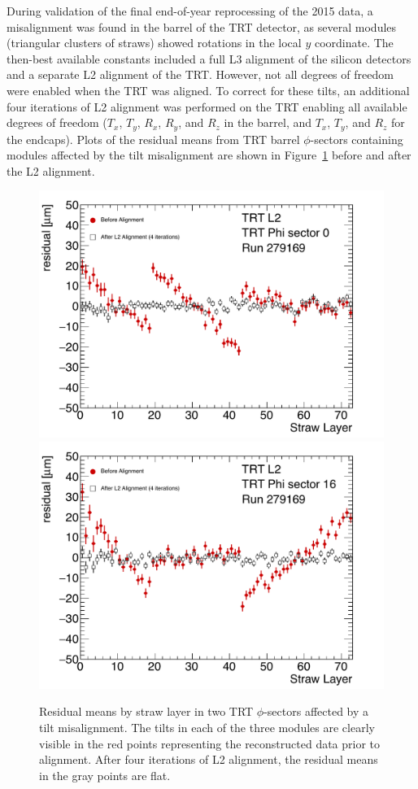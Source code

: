 During validation of the final end-of-year reprocessing of the 2015 data, a misalignment was found in the barrel of the TRT detector, as several modules (triangular clusters of straws) showed rotations in the local $y$ coordinate.
The then-best available constants included a full L3 alignment of the silicon detectors and a separate L2 alignment of the TRT.
However, not all degrees of freedom were enabled when the TRT was aligned.
To correct for these tilts, an additional four iterations of L2 alignment was performed on the TRT enabling all available degrees of freedom ($T_x$, $T_y$, $R_x$, $R_y$, and $R_z$ in the barrel, and $T_x$, $T_y$, and $R_z$ for the endcaps).
Plots of the residual means from TRT barrel $\phi$-sectors containing modules affected by the tilt misalignment are shown in Figure~\ref{fig:align_trt_l2} before and after the L2 alignment.

\begin{figure}[htbp]
  \centering
  \includegraphics[width=.48\textwidth]{figs/alignment/trt/TRT_aveResVsStrawLayerModule0}
  \includegraphics[width=.48\textwidth]{figs/alignment/trt/TRT_aveResVsStrawLayerModule16}
  \caption{Residual means by straw layer in two TRT $\phi$-sectors affected by a tilt misalignment.  The tilts in each of the three modules are clearly visible in the red points representing the reconstructed data prior to alignment.  After four iterations of L2 alignment, the residual means in the gray points are flat.}
  \label{fig:align_trt_l2}
\end{figure}

